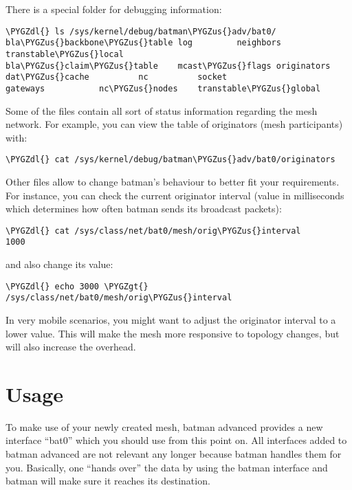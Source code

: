 \documentclass[a4paper,8pt,english]{sphinxmanual}
\def\PYGZus{\char`\_}
\def\PYGZgt{\char`\>}
\def\PYGZdl{\char`\$}
\begin{document}
There is a special folder for debugging information:

\begin{Verbatim}[commandchars=\\\{\}]
\PYGZdl{} ls /sys/kernel/debug/batman\PYGZus{}adv/bat0/
bla\PYGZus{}backbone\PYGZus{}table log         neighbors         transtable\PYGZus{}local
bla\PYGZus{}claim\PYGZus{}table    mcast\PYGZus{}flags originators
dat\PYGZus{}cache          nc          socket
gateways           nc\PYGZus{}nodes    transtable\PYGZus{}global
\end{Verbatim}

Some of the files contain all sort of status information regarding the mesh
network. For example, you can view the table of originators (mesh
participants) with:

\begin{Verbatim}[commandchars=\\\{\}]
\PYGZdl{} cat /sys/kernel/debug/batman\PYGZus{}adv/bat0/originators
\end{Verbatim}

Other files allow to change batman's behaviour to better fit your requirements.
For instance, you can check the current originator interval (value in
milliseconds which determines how often batman sends its broadcast packets):

\begin{Verbatim}[commandchars=\\\{\}]
\PYGZdl{} cat /sys/class/net/bat0/mesh/orig\PYGZus{}interval
1000
\end{Verbatim}

and also change its value:

\begin{Verbatim}[commandchars=\\\{\}]
\PYGZdl{} echo 3000 \PYGZgt{} /sys/class/net/bat0/mesh/orig\PYGZus{}interval
\end{Verbatim}

In very mobile scenarios, you might want to adjust the originator interval to a
lower value. This will make the mesh more responsive to topology changes, but
will also increase the overhead.


\section{Usage}
\label{networking/batman-adv:usage}
To make use of your newly created mesh, batman advanced provides a new
interface ``bat0'' which you should use from this point on. All interfaces added
to batman advanced are not relevant any longer because batman handles them for
you. Basically, one ``hands over'' the data by using the batman interface and
batman will make sure it reaches its destination.
\end{document}
